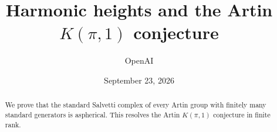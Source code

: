 \documentclass[11pt]{article}
\title{Harmonic heights and the Artin \(K(\pi,1)\) conjecture}
\author{OpenAI}
\date{September 23, 2026}
\theoremstyle{definition}
\theoremstyle{remark}
\numberwithin{equation}{section}
\begin{document}
\maketitle
\begin{abstract}
We prove that the standard Salvetti complex of every Artin group with
finitely many standard generators is aspherical. This resolves the Artin
\(K(\pi,1)\) conjecture in finite rank.
\end{abstract}
\tableofcontents










\begingroup
\raggedright


\endgroup
\end{document}
